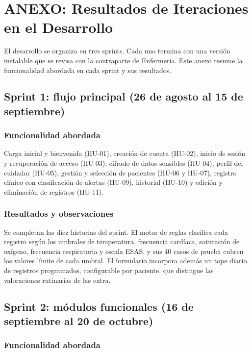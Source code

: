\chapter[Anexo: Resultados de Iteraciones]{ANEXO: Resultados de Iteraciones en el Desarrollo}

El desarrollo se organiza en tres sprints. Cada uno termina con una versión
instalable que se revisa con la contraparte de Enfermería. Este anexo resume la
funcionalidad abordada en cada sprint y sus resultados.

\section{Sprint 1: flujo principal (26 de agosto al 15 de septiembre)}

\subsection*{Funcionalidad abordada}

Carga inicial y bienvenida (HU-01), creación de cuenta (HU-02), inicio de sesión
y recuperación de acceso (HU-03), cifrado de datos sensibles (HU-04), perfil del
cuidador (HU-05), gestión y selección de pacientes (HU-06 y HU-07), registro
clínico con clasificación de alertas (HU-09), historial (HU-10) y edición y
eliminación de registros (HU-11).

\subsection*{Resultados y observaciones}

Se completan las diez historias del sprint. El motor de reglas clasifica cada
registro según los umbrales de temperatura, frecuencia cardíaca, saturación de
oxígeno, frecuencia respiratoria y escala ESAS, y sus 40 casos de prueba cubren
los valores límite de cada umbral. El formulario incorpora además un tope
diario de registros programados, configurable por paciente, que distingue las
valoraciones rutinarias de las extra.

\section{Sprint 2: módulos funcionales (16 de septiembre al 20 de octubre)}

\subsection*{Funcionalidad abordada}

